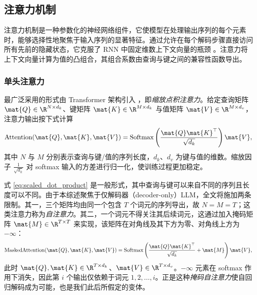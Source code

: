 \subsection{注意力机制}

注意力机制是一种参数化的神经网络组件，它使模型在处理输出序列的每个元素时，能够选择性地聚焦于输入序列的显著特征。通过允许在每个解码步骤直接访问所有先前的隐藏状态，它克服了 RNN 中固定维数上下文向量的瓶颈 \cite{bahdanau2016attention}。注意力将上下文向量计算为值的凸组合，其组合系数由查询与键之间的兼容性函数导出。



\subsubsection{单头注意力}

最广泛采用的形式由 Transformer 架构引入 \cite{vaswani2017attention}，即\textit{缩放点积注意力}。给定查询矩阵 $\mat{Q} \in \R^{N \times d_k}$、键矩阵 $\mat{K} \in \R^{M \times d_k}$ 与值矩阵 $\mat{V} \in \R^{M \times d_v}$，注意力输出按下式计算
\begin{equation}
\text{Attention}(\mat{Q}, \mat{K}, \mat{V}) = \text{Softmax}\left( \frac{\mat{Q} \mat{K}^\top}{\sqrt{d_k}} \right) \mat{V},
\label{eq:scaled_dot_product}
\end{equation}
其中 $N$ 与 $M$ 分别表示查询与键/值的序列长度，$d_k$、$d_v$ 为键与值的维数。缩放因子 $\frac{1}{\sqrt{d_k}}$ 对 softmax 输入的方差进行归一化，使训练过程更加稳定。

式 \ref{eq:scaled_dot_product} 是一般形式，其中查询与键可以来自不同的序列且长度可以不同。由于本综述聚焦于仅解码器（decoder-only）LLM，全文将施加两条限制。其一，三个矩阵均由同一个包含 $T$ 个词元的序列导出，故 $N = M = T$；这类注意力称为\emph{自注意力}。其二，一个词元不得关注其后续词元，这通过加入掩码矩阵 $\mat{M} \in \R^{T \times T}$ 来实现，该矩阵在对角线及其下方为零、对角线上方为 $-\infty$：
\begin{equation}
\label{eq:masked_attention}
  \text{MaskedAttention}(\mat{Q}, \mat{K}, \mat{V}) = \text{Softmax}\left( \frac{\mat{Q} \mat{K}^\top}{\sqrt{d_k}} + \mat{M} \right) \mat{V},
\end{equation}
此时 $\mat{Q}, \mat{K} \in \R^{T \times d_k}$、$\mat{V} \in \R^{T \times d_v}$。$-\infty$ 元素在 softmax 作用下消失，因此第 $i$ 个输出仅依赖于词元 $1,2, \ldots, i$。正是这种\emph{掩码自注意力}使自回归解码成为可能，也是我们此后所假定的变体。

